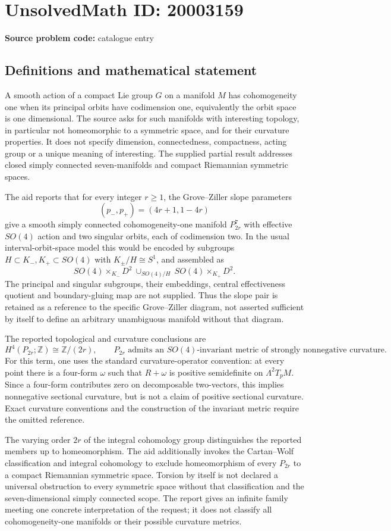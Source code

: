 \documentclass[11pt]{article}
\newcommand{\Z}{\mathbb{Z}}
\begin{document}
\section*{UnsolvedMath ID: 20003159}
\textbf{Source problem code:} catalogue entry
\subsection{Definitions and mathematical statement}
A smooth action of a compact Lie group $G$ on a manifold $M$ has cohomogeneity one when its principal orbits have codimension one, equivalently the orbit space is one dimensional. The source asks for such manifolds with interesting topology, in particular not homeomorphic to a symmetric space, and for their curvature properties. It does not specify dimension, connectedness, compactness, acting group or a unique meaning of interesting. The supplied partial result addresses closed simply connected seven-manifolds and compact Riemannian symmetric spaces.

The aid reports that for every integer $r\geq1$, the Grove--Ziller slope parameters
\[
 (p_-,p_+)=(4r+1,1-4r)
\]
give a smooth simply connected cohomogeneity-one manifold $P_{2r}^7$ with effective $SO(4)$ action and two singular orbits, each of codimension two. In the usual interval-orbit-space model this would be encoded by subgroups $H\subset K_-,K_+\subset SO(4)$ with $K_\pm/H\cong S^1$, and assembled as
\[
 SO(4)\times_{K_-}D^2\ \cup_{SO(4)/H}\
 SO(4)\times_{K_+}D^2.
\]
The principal and singular subgroups, their embeddings, central effectiveness quotient and boundary-gluing map are not supplied. Thus the slope pair is retained as a reference to the specific Grove--Ziller diagram, not asserted sufficient by itself to define an arbitrary unambiguous manifold without that diagram.

The reported topological and curvature conclusions are
\[
 H^4(P_{2r};\Z)\cong\Z/(2r),
 \qquad P_{2r}\text{ admits an }SO(4)\text{-invariant metric of strongly nonnegative curvature}.
\]
For this term, one uses the standard curvature-operator convention: at every point there is a four-form $\omega$ such that $R+\omega$ is positive semidefinite on $\Lambda^2T_pM$. Since a four-form contributes zero on decomposable two-vectors, this implies nonnegative sectional curvature, but is not a claim of positive sectional curvature. Exact curvature conventions and the construction of the invariant metric require the omitted reference.

The varying order $2r$ of the integral cohomology group distinguishes the reported members up to homeomorphism. The aid additionally invokes the Cartan--Wolf classification and integral cohomology to exclude homeomorphism of every $P_{2r}$ to a compact Riemannian symmetric space. Torsion by itself is not declared a universal obstruction to every symmetric space without that classification and the seven-dimensional simply connected scope. The report gives an infinite family meeting one concrete interpretation of the request; it does not classify all cohomogeneity-one manifolds or their possible curvature metrics.
\end{document}
